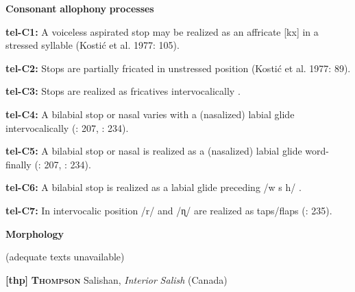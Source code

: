 \documentclass[output=paper]{langsci/langscibook}
\begin{document}
\begin{styleBody}
\textbf{Consonant} \textbf{allophony} \textbf{processes}
\end{styleBody}

\begin{styleBody}
\textbf{tel-C1:} A voiceless aspirated stop may be realized as an affricate [kx] in a stressed syllable (Kostić et al. 1977: 105).
\end{styleBody}

\begin{styleBody}
\textbf{tel-C2:} Stops are partially fricated in unstressed position (Kostić et al. 1977: 89).
\end{styleBody}

\begin{styleBody}
\textbf{tel-C3:} Stops are realized as fricatives intervocalically \citep[207]{Krishnamurti1998}.
\end{styleBody}

\begin{styleBody}
\textbf{tel-C4:} A bilabial stop or nasal varies with a (nasalized) labial glide intervocalically (\citealt{Krishnamurti1998}: 207, \citealt{BhaskararaoRay2017}: 234).
\end{styleBody}

\begin{styleBody}
\textbf{tel-C5:} A bilabial stop or nasal is realized as a (nasalized) labial glide word-finally (\citealt{Krishnamurti1998}: 207, \citealt{BhaskararaoRay2017}: 234).
\end{styleBody}

\begin{styleBody}
\textbf{tel-C6:} A bilabial stop is realized as a labial glide preceding /w s h/ \citep[207]{Krishnamurti1998}.
\end{styleBody}

\begin{styleBody}
\textbf{tel-C7:} In intervocalic position /r/ and /ɳ/ are realized as taps/flaps (\citealt{BhaskararaoRay2017}: 235).
\end{styleBody}

\begin{styleBody}
\textbf{Morphology}
\end{styleBody}

\begin{styleBody}
(adequate texts unavailable)
\end{styleBody}

\begin{styleBody}
\textbf{[thp]}   \textbf{\textsc{Thompson}}  Salishan, \textit{Interior} \textit{Salish} (Canada)
\end{styleBody}
\end{document}
